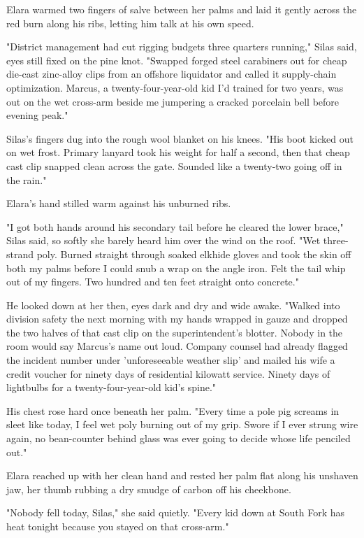 Elara warmed two fingers of salve between her palms and laid it gently across the red burn along his ribs, letting him talk at his own speed.

"District management had cut rigging budgets three quarters running," Silas said, eyes still fixed on the pine knot. "Swapped forged steel carabiners out for cheap die-cast zinc-alloy clips from an offshore liquidator and called it supply-chain optimization. Marcus, a twenty-four-year-old kid I'd trained for two years, was out on the wet cross-arm beside me jumpering a cracked porcelain bell before evening peak."

Silas's fingers dug into the rough wool blanket on his knees. "His boot kicked out on wet frost. Primary lanyard took his weight for half a second, then that cheap cast clip snapped clean across the gate. Sounded like a twenty-two going off in the rain."

Elara's hand stilled warm against his unburned ribs.

"I got both hands around his secondary tail before he cleared the lower brace," Silas said, so softly she barely heard him over the wind on the roof. "Wet three-strand poly. Burned straight through soaked elkhide gloves and took the skin off both my palms before I could snub a wrap on the angle iron. Felt the tail whip out of my fingers. Two hundred and ten feet straight onto concrete."

He looked down at her then, eyes dark and dry and wide awake. "Walked into division safety the next morning with my hands wrapped in gauze and dropped the two halves of that cast clip on the superintendent's blotter. Nobody in the room would say Marcus's name out loud. Company counsel had already flagged the incident number under 'unforeseeable weather slip' and mailed his wife a credit voucher for ninety days of residential kilowatt service. Ninety days of lightbulbs for a twenty-four-year-old kid's spine."

His chest rose hard once beneath her palm. "Every time a pole pig screams in sleet like today, I feel wet poly burning out of my grip. Swore if I ever strung wire again, no bean-counter behind glass was ever going to decide whose life penciled out."

Elara reached up with her clean hand and rested her palm flat along his unshaven jaw, her thumb rubbing a dry smudge of carbon off his cheekbone.

"Nobody fell today, Silas," she said quietly. "Every kid down at South Fork has heat tonight because you stayed on that cross-arm."

